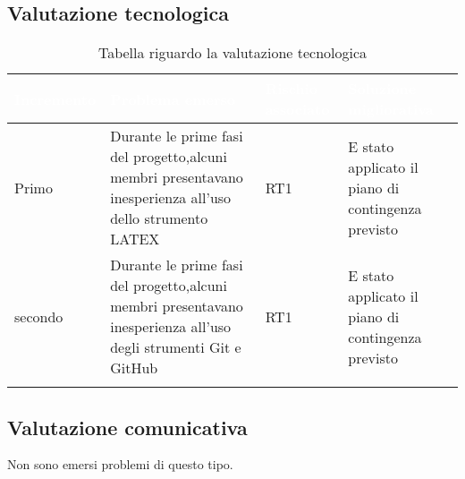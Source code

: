 \newpage
\subsection{Valutazione tecnologica}
{
    \setlength{\freewidth}{\dimexpr\textwidth-10\tabcolsep}
    \renewcommand{\arraystretch}{1.5}
    \centering
    \setlength{\aboverulesep}{0pt}
    \setlength{\belowrulesep}{0pt}
    \begin{longtable}{C{.25\freewidth} C{.257\freewidth} C{.16\freewidth} C{.4\freewidth}}
       \toprule
    \textcolor{white}{\textbf{Incremento}}&
    \textcolor{white}{\textbf{Problema emerso}}&
    \textcolor{white}{\textbf{Rischio associato}}&
    \textcolor{white}{\textbf{Soluzione migliorativa}}\\	
    \toprule
    \endhead
    
Primo & Durante le prime fasi del progetto,alcuni membri presentavano inesperienza all'uso dello strumento LATEX & RT1 & E stato applicato il piano di contingenza
previsto \\
secondo & Durante le prime fasi del progetto,alcuni membri presentavano inesperienza all'uso degli strumenti Git e GitHub & RT1 & E stato applicato il piano di contingenza
previsto\\

 \bottomrule
 \caption{Tabella riguardo la valutazione tecnologica}
\end{longtable}
}

\subsection{Valutazione comunicativa}
{
Non sono emersi problemi di questo tipo. 
}
